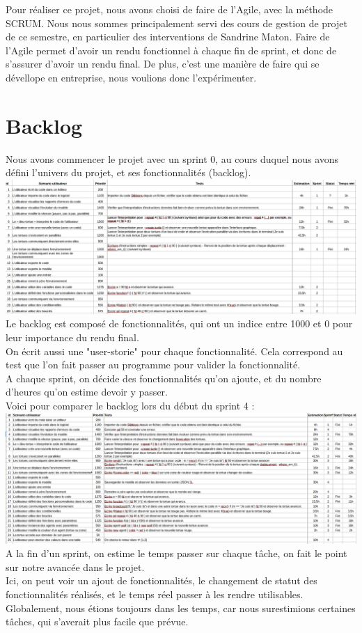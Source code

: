 Pour réaliser ce projet, nous avons choisi de faire de l'Agile, avec la méthode SCRUM. Nous nous sommes principalement servi des cours de gestion de projet de ce semestre, en particulier des interventions de Sandrine Maton. Faire de l'Agile permet d'avoir un rendu fonctionnel à chaque fin de sprint, et donc de s'assurer d'avoir un rendu final. De plus, c'est une manière de faire qui se dévellope en entreprise, nous voulions donc l'expérimenter.
\section{Backlog}
Nous avons commencer le projet avec un sprint 0, au cours duquel nous avons défini l'univers du projet, et ses fonctionnalités (backlog).\\

\includegraphics[scale=0.35]{doc/report/uml/backlogv1.png}
Le backlog est composé de fonctionnalités, qui ont un indice entre 1000 et 0 pour leur importance du rendu final.\\ On écrit aussi une "user-storie" pour chaque fonctionnalité. Cela correspond au test que l'on fait passer au programme pour valider la fonctionnalité.\\
A chaque sprint, on décide des fonctionnalités qu'on ajoute, et du nombre d'heures qu'on estime devoir y passer.\\
Voici pour comparer le backlog lors du début du sprint 4 :\\
\includegraphics[scale=0.35]{doc/report/uml/backlogsp4.png}
A la fin d'un sprint, on estime le temps passer sur chaque tâche, on fait le point sur notre avancée dans le projet.\\Ici, on peut voir un ajout de fonctionnalités, le changement de statut des fonctionnalités réalisés, et le temps réel passer à les rendre utilisables.
Globalement, nous étions toujours dans les temps, car nous surestimions certaines tâches, qui s'averait plus facile que prévue.


